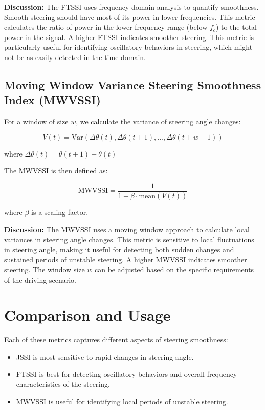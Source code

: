 \textbf{Discussion:} The FTSSI uses frequency domain analysis to quantify smoothness. Smooth steering should have most of its power in lower frequencies. This metric calculates the ratio of power in the lower frequency range (below $f_c$) to the total power in the signal. A higher FTSSI indicates smoother steering. This metric is particularly useful for identifying oscillatory behaviors in steering, which might not be as easily detected in the time domain.

\subsection{Moving Window Variance Steering Smoothness Index (MWVSSI)}

\begin{definition}
For a window of size $w$, we calculate the variance of steering angle changes:

\[ V(t) = \text{Var}(\Delta\theta(t), \Delta\theta(t+1), ..., \Delta\theta(t+w-1)) \]

where $\Delta\theta(t) = \theta(t+1) - \theta(t)$

The MWVSSI is then defined as:

\[ \text{MWVSSI} = \frac{1}{1 + \beta \cdot \text{mean}(V(t))} \]

where $\beta$ is a scaling factor.
\end{definition}

\textbf{Discussion:} The MWVSSI uses a moving window approach to calculate local variances in steering angle changes. This metric is sensitive to local fluctuations in steering angle, making it useful for detecting both sudden changes and sustained periods of unstable steering. A higher MWVSSI indicates smoother steering. The window size $w$ can be adjusted based on the specific requirements of the driving scenario.

\section{Comparison and Usage}

Each of these metrics captures different aspects of steering smoothness:

\begin{itemize}
    \item JSSI is most sensitive to rapid changes in steering angle.
    \item FTSSI is best for detecting oscillatory behaviors and overall frequency characteristics of the steering.
    \item MWVSSI is useful for identifying local periods of unstable steering.
\end{itemize}

